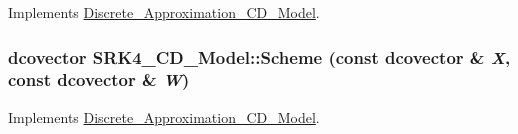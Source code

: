 Implements \hyperlink{class_discrete___approximation___c_d___model_7a3dcae055d90be0b8a231eff961e2a2}{Discrete\_\-Approximation\_\-CD\_\-Model}.\hypertarget{class_s_r_k4___c_d___model_553c1dc82fe1e497ff73a919e6bd98e6}{
\subsubsection[{Scheme}]{\setlength{\rightskip}{0pt plus 5cm}dcovector SRK4\_\-CD\_\-Model::Scheme (const dcovector \& {\em X}, \/  const dcovector \& {\em W})}}
\label{class_s_r_k4___c_d___model_553c1dc82fe1e497ff73a919e6bd98e6}




Implements \hyperlink{class_discrete___approximation___c_d___model_1ea9a1d618890fc51db6fa98eeb7af7f}{Discrete\_\-Approximation\_\-CD\_\-Model}.